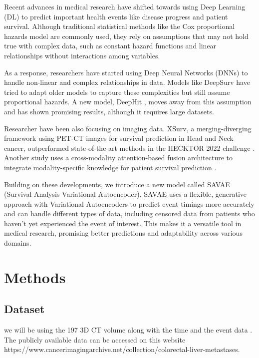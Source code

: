 \documentclass{article}
\begin{document}
Recent advances in medical research have shifted towards using Deep Learning (DL) to predict important health events like disease progress and patient survival. Although traditional statistical methods like the Cox proportional hazards model \cite{kraisangka2018bayesian} are commonly used, they rely on assumptions that may not hold true with complex data, such as constant hazard functions and linear relationships without interactions among variables. 

As a response, researchers have started using Deep Neural Networks (DNNs) to handle non-linear and complex relationships in data. Models like DeepSurv \cite{jared2016deep} have tried to adapt older models to capture these complexities but still assume proportional hazards. A new model, DeepHit \cite{lee2018deephit}, moves away from this assumption and has shown promising results, although it requires large datasets.

Researcher have been also focusing on imaging data. XSurv, a merging-diverging framework using PET-CT images for survival prediction in Head and Neck cancer, outperformed state-of-the-art methods in the HECKTOR 2022 challenge \cite{meng2023merging}. Another study uses a cross-modality attention-based fusion architecture to integrate modality-specific knowledge for patient survival prediction \cite{deng2024cross}.

Building on these developments, we introduce a new model called SAVAE (Survival Analysis Variational Autoencoder). SAVAE uses a flexible, generative approach with Variational Autoencoders to predict event timings more accurately and can handle different types of data, including censored data from patients who haven't yet experienced the event of interest. This makes it a versatile tool in medical research, promising better predictions and adaptability across various domains.

\section{Methods}
\subsection{Dataset}
we will be using the 197 3D CT volume along with the time and the event data \cite{simpson2024preoperative}. The publicly available data can be accessed on this website  https://www.cancerimagingarchive.net/collection/colorectal-liver-metastases. 
\end{document}
